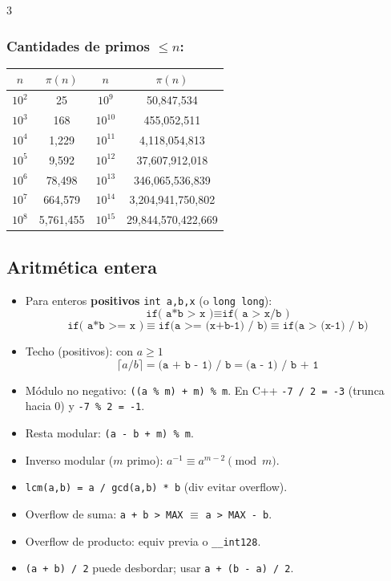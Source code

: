 \documentclass[8pt, spanish, mexico, letterpaper]{extarticle}
\newcommand{\<}{<}
\begin{document}
\begin{multicols*}{3}
\normalsize

\columnbreak
\subsubsection*{Cantidades de primos $\le n$:}
\begin{center}

\begin{tabular}{cc | cc }
$n$ & $\pi(n)$ & $n$ & $\pi(n)$ \\ \hline
$10^2$ & 25 & $10^9$ & 50,847,534  \\
$10^3$ & 168 & $10^{10}$ & 455,052,511  \\
$10^4$ & 1,229 & $10^{11}$ & 4,118,054,813 \\
$10^5$ & 9,592 & $10^{12}$ & 37,607,912,018  \\
$10^6$ & 78,498 & $10^{13}$ & 346,065,536,839  \\
$10^7$ & 664,579 & $10^{14}$ & 3,204,941,750,802  \\
$10^8$ & 5,761,455 & $10^{15}$ & 29,844,570,422,669  
\end{tabular}
\end{center}








\subsection*{Aritmética entera}





\begin{itemize}
\item Para enteros \textbf{positivos} \texttt{int a,b,x} (o \texttt{long long}):
$$ \texttt{if( a*b > x )} \equiv \texttt{if( a > x/b )}$$
$$\texttt{if( a*b >= x )}\equiv
\texttt{if(a >= (x+b-1) / b)}
    \equiv \texttt{if(a > (x-1) / b)} $$
  \item Techo (positivos): con $a\ge1$
  $$ \lceil a/b\rceil = \texttt{(a + b - 1) / b} = \texttt{(a - 1) / b + 1}$$ 
  \item Módulo no negativo: \texttt{((a \% m) + m) \% m}. En C++ \texttt{-7 / 2 = -3} (trunca hacia 0) y \texttt{-7 \% 2 = -1}.
  \item Resta modular: \texttt{(a - b + m) \% m}. 
  \item Inverso modular ($m$ primo): \(a^{-1}\equiv a^{m-2}\pmod m\).
  \item \texttt{lcm(a,b) = a / gcd(a,b) * b} (div evitar overflow).
  \item Overflow de suma: \texttt{a + b > MAX} $\equiv$ \texttt{a > MAX - b}.
  \item Overflow de producto: equiv previa o \texttt{\_\_int128}.
  \item \texttt{(a + b) / 2} puede desbordar; usar \texttt{a + (b - a) / 2}.
\end{itemize}



\end{multicols*}
\end{document}
